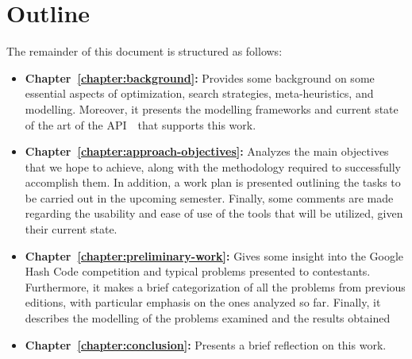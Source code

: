 \section{Outline}
\label{section:outline}

The remainder of this document is structured as follows:

\begin{itemize}
      \item \textbf{Chapter~\ref{chapter:background}:} Provides some background
            on some essential aspects of optimization, search strategies,
            meta-heuristics, and modelling. Moreover, it presents the modelling
            frameworks and current state of the art of the API~\cite{outeiro2021application}~that
            supports this work.

      \item \textbf{Chapter~\ref{chapter:approach-objectives}:} Analyzes the main objectives
            that we hope to achieve, along with the methodology required to successfully
            accomplish them. In addition, a work plan is presented outlining the tasks to
            be carried out in the upcoming semester. Finally, some comments are made
            regarding the usability and ease of use of the tools that will be utilized,
            given their current state.


      \item \textbf{Chapter~\ref{chapter:preliminary-work}:}
            Gives some insight into the Google Hash Code competition and typical
            problems presented to contestants. Furthermore, it makes a brief
            categorization of all the problems from previous editions, with particular
            emphasis on the ones analyzed so far. Finally, it describes the modelling
            of the problems examined and the results obtained


      \item \textbf{Chapter~\ref{chapter:conclusion}:} Presents a brief reflection on this work.

\end{itemize}


